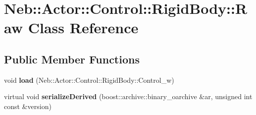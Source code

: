 \hypertarget{classNeb_1_1Actor_1_1Control_1_1RigidBody_1_1Raw}{\section{\-Neb\-:\-:\-Actor\-:\-:\-Control\-:\-:\-Rigid\-Body\-:\-:\-Raw \-Class \-Reference}
\label{classNeb_1_1Actor_1_1Control_1_1RigidBody_1_1Raw}
}
\subsection*{\-Public \-Member \-Functions}
\begin{DoxyCompactItemize}
\item 
\hypertarget{classNeb_1_1Actor_1_1Control_1_1RigidBody_1_1Raw_a50e97ae889581d1ae6470eb2665c1ecc}{void {\bfseries load} (\-Neb\-::\-Actor\-::\-Control\-::\-Rigid\-Body\-::\-Control\-\_\-w)}\label{classNeb_1_1Actor_1_1Control_1_1RigidBody_1_1Raw_a50e97ae889581d1ae6470eb2665c1ecc}

\item 
\hypertarget{classNeb_1_1Actor_1_1Control_1_1RigidBody_1_1Raw_aaf1dafa5a362834162ab2eb19e174e1a}{virtual void {\bfseries serialize\-Derived} (boost\-::archive\-::binary\-\_\-oarchive \&ar, unsigned int const \&version)}\label{classNeb_1_1Actor_1_1Control_1_1RigidBody_1_1Raw_aaf1dafa5a362834162ab2eb19e174e1a}

\end{DoxyCompactItemize}
